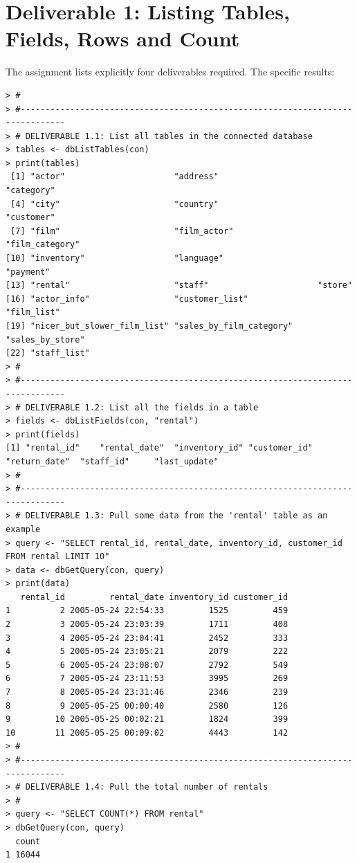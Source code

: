 \documentclass[a4paper,11pt]{extarticle}
\begin{document}
\section*{Deliverable 1: Listing Tables, Fields, Rows and Count}
The assignment lists explicitly four deliverables required. The specific results:
\begin{verbatim}
> #
> #-------------------------------------------------------------------------------
> # DELIVERABLE 1.1: List all tables in the connected database
> tables <- dbListTables(con)
> print(tables)
 [1] "actor"                      "address"                    "category"                  
 [4] "city"                       "country"                    "customer"                  
 [7] "film"                       "film_actor"                 "film_category"             
[10] "inventory"                  "language"                   "payment"                   
[13] "rental"                     "staff"                      "store"                     
[16] "actor_info"                 "customer_list"              "film_list"                 
[19] "nicer_but_slower_film_list" "sales_by_film_category"     "sales_by_store"            
[22] "staff_list"                
> #
> #-------------------------------------------------------------------------------
> # DELIVERABLE 1.2: List all the fields in a table
> fields <- dbListFields(con, "rental")
> print(fields)
[1] "rental_id"    "rental_date"  "inventory_id" "customer_id"  "return_date"  "staff_id"     "last_update" 
> #
> #-------------------------------------------------------------------------------
> # DELIVERABLE 1.3: Pull some data from the 'rental' table as an example
> query <- "SELECT rental_id, rental_date, inventory_id, customer_id FROM rental LIMIT 10"
> data <- dbGetQuery(con, query)
> print(data)
   rental_id         rental_date inventory_id customer_id
1          2 2005-05-24 22:54:33         1525         459
2          3 2005-05-24 23:03:39         1711         408
3          4 2005-05-24 23:04:41         2452         333
4          5 2005-05-24 23:05:21         2079         222
5          6 2005-05-24 23:08:07         2792         549
6          7 2005-05-24 23:11:53         3995         269
7          8 2005-05-24 23:31:46         2346         239
8          9 2005-05-25 00:00:40         2580         126
9         10 2005-05-25 00:02:21         1824         399
10        11 2005-05-25 00:09:02         4443         142
> #
> #-------------------------------------------------------------------------------
> # DELIVERABLE 1.4: Pull the total number of rentals
> #
> query <- "SELECT COUNT(*) FROM rental"
> dbGetQuery(con, query)
  count
1 16044
\end{verbatim}
\newpage
\end{document}
